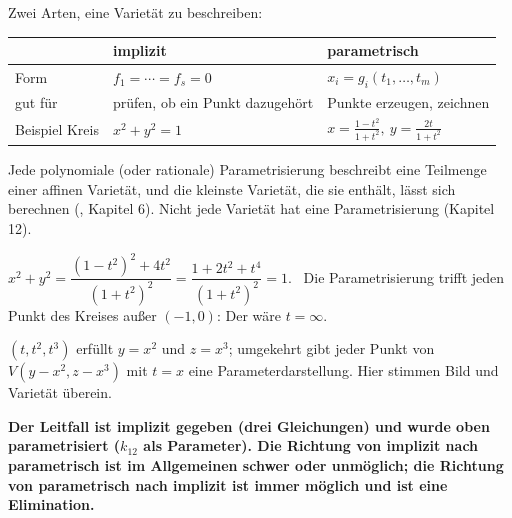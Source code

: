 \begin{merksatz}
Zwei Arten, eine Varietät zu beschreiben:
\begin{center}
{\small
\renewcommand{\arraystretch}{1.5}
\begin{tabular}{@{}P{2.4cm}P{3.0cm}P{3.2cm}@{}}
\toprule
 & \textbf{implizit} & \textbf{parametrisch}\\
\midrule
Form & $f_1 = \cdots = f_s = 0$ & $x_i = g_i(t_1, \ldots, t_m)$\\
gut für & prüfen, ob ein Punkt dazugehört & Punkte erzeugen, zeichnen\\
Beispiel Kreis & $x^{2} + y^{2} = 1$ & $x = \frac{1-t^{2}}{1+t^{2}},\ y = \frac{2t}{1+t^{2}}$\\
\bottomrule
\end{tabular}}
\end{center}
Jede polynomiale (oder rationale) Parametrisierung beschreibt eine Teilmenge einer affinen Varietät, und die kleinste Varietät, die sie enthält, lässt sich berechnen (, Kapitel 6). Nicht jede Varietät hat eine Parametrisierung (Kapitel 12).

$x^{2} + y^{2} = \dfrac{(1-t^{2})^{2} + 4t^{2}}{(1+t^{2})^{2}} = \dfrac{1 + 2t^{2} + t^{4}}{(1+t^{2})^{2}} = 1$. \checkmark\ Die Parametrisierung trifft jeden Punkt des Kreises außer $(-1, 0)$: Der wäre $t = \infty$.

$(t, t^{2}, t^{3})$ erfüllt $y = x^{2}$ und $z = x^{3}$; umgekehrt gibt jeder Punkt von $V(y - x^{2}, z - x^{3})$ mit $t = x$ eine Parameterdarstellung. Hier stimmen Bild und Varietät überein.

\begin{center}
\begin{minipage}{0.9\textwidth}
\textbf{Der Leitfall ist implizit gegeben (drei Gleichungen) und wurde oben parametrisiert ($k_{12}$ als Parameter). Die Richtung von implizit nach parametrisch ist im Allgemeinen schwer oder unmöglich; die Richtung von parametrisch nach implizit ist immer möglich und ist eine Elimination.}
\end{minipage}
\end{center}

\begin{center}
\begin{minipage}{0.88\textwidth}
\end{minipage}
\end{center}
\end{merksatz}


